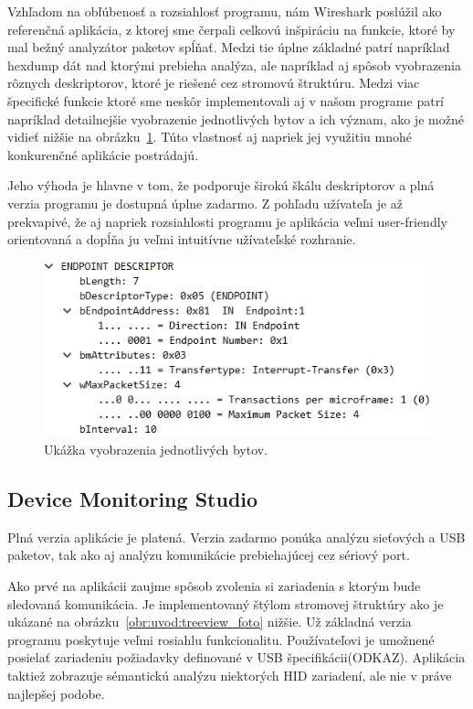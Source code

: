 Vzhľadom na obľúbenosť a rozsiahlosť programu, nám Wireshark poslúžil ako referenčná aplikácia, z ktorej sme čerpali celkovú inšpiráciu na funkcie, ktoré by mal bežný analyzátor paketov spĺňať. Medzi tie úplne základné patrí napríklad hexdump dát nad ktorými prebieha analýza, ale napríklad aj spôsob vyobrazenia rôznych deskriptorov, ktoré je riešené cez stromovú štruktúru. Medzi viac špecifické funkcie ktoré sme neskôr implementovali aj v našom programe patrí napríklad detailnejšie vyobrazenie jednotlivých bytov a ich význam, ako je možné vidieť nižšie na obrázku~\ref{obr:uvod:byte_detail_foto}. Túto vlastnosť aj napriek jej využitiu mnohé konkurenčné aplikácie postrádajú.

Jeho výhoda je hlavne v tom, že podporuje širokú škálu deskriptorov a plná verzia programu je dostupná úplne zadarmo. Z pohľadu užívateľa je až prekvapivé, že aj napriek rozsiahlosti programu je aplikácia veľmi user-friendly orientovaná a dopĺňa ju veľmi intuitívne užívateľské rozhranie.

\begin{figure}
	\centering
	\includegraphics[width=\textwidth]{img/uvod_byte_detail}
	\caption{Ukážka vyobrazenia jednotlivých bytov.}
	\label{obr:uvod:byte_detail_foto}
\end{figure}

\subsection*{Device Monitoring Studio}

Plná verzia aplikácie je platená. Verzia zadarmo ponúka analýzu sieťových a USB paketov, tak ako aj analýzu komunikácie prebiehajúcej cez sériový port. 

Ako prvé na aplikácii zaujme spôsob zvolenia si zariadenia s ktorým bude sledovaná komunikácia. Je implementovaný štýlom stromovej štruktúry ako je ukázané na obrázku~\ref{obr:uvod:treeview_foto} nižšie. Už základná verzia programu poskytuje veľmi rosiahlu funkcionalitu. Používateľovi je umožnené posielať zariadeniu požiadavky definované v USB špecifikácii(ODKAZ). Aplikácia taktiež zobrazuje sémantickú analýzu niektorých HID zariadení, ale nie v práve najlepšej podobe. 

